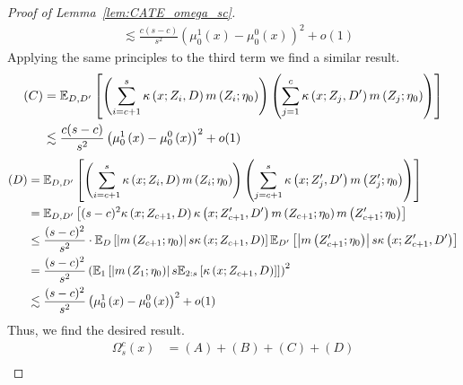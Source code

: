 \begin{proof}[Proof of Lemma~\ref{lem:CATE_omega_sc}]
\begin{equation}
\begin{aligned}
			& \lesssim \frac{c(s-c)}{s^2}\left(\mu_{0}^{1}\left(x\right) - \mu_{0}^{0}\left(x\right)\right)^2  + o(1)
		\end{aligned}
	\end{equation}
	Applying the same principles to the third term we find a similar result.
	\begin{equation}
		\begin{aligned}
			(C)
			& = \mathbb{E}_{D, D^{\prime}}\left[\left(\sum_{i = c + 1}^{s} \kappa\left(x; Z_{i}, D\right) m\left(Z_{i}; \eta_{0}\right)\right)
            \left(\sum_{j = 1}^{c} \kappa\left(x; Z_{j}, D^{\prime}\right) m\left(Z_{j}; \eta_{0}\right)\right)\right]\\
			& \lesssim \frac{c(s-c)}{s^2}\left(\mu_{0}^{1}\left(x\right) - \mu_{0}^{0}\left(x\right)\right)^2  + o(1)
		\end{aligned}
	\end{equation}
	\begin{equation}
		\begin{aligned}
			(D)
			& = \mathbb{E}_{D, D^{\prime}}\left[\left(\sum_{i = c + 1}^{s} \kappa\left(x; Z_{i}, D\right) m\left(Z_{i}; \eta_{0}\right)\right)
            \left(\sum_{j = c + 1}^{s} \kappa\left(x; Z_{j}^{\prime}, D^{\prime}\right) m\left(Z_{j}^{\prime}; \eta_{0}\right)\right)\right] \\
			& = \mathbb{E}_{D, D^{\prime}}\left[(s-c)^2 \kappa\left(x; Z_{c+1}, D\right)\kappa\left(x; Z_{c+1}^{\prime}, D^{\prime}\right)
			 m\left(Z_{c+1}; \eta_{0}\right)  m\left(Z_{c+1}^{\prime}; \eta_{0}\right)\right] \\
			 & \leq \frac{(s-c)^2}{s^2} \cdot \mathbb{E}_{D}\left[\left|m\left(Z_{c+1}; \eta_{0}\right)\right| s \kappa\left(x; Z_{c+1}, D\right)\right]
			 \mathbb{E}_{D^{\prime}}\left[\left|m\left(Z_{c+1}^{\prime}; \eta_{0}\right)\right| s \kappa\left(x; Z_{c+1}^{\prime}, D^{\prime}\right) \right]\\
			 & = \frac{(s-c)^2}{s^2} \left(\mathbb{E}_{1}\left[\left|m\left(Z_{1}; \eta_{0}\right)\right| s \mathbb{E}_{2:s}\left[\kappa\left(x; Z_{c+1}, D\right)\right]\right]\right)^2 \\
			 & \lesssim \frac{(s-c)^2}{s^2}\left(\mu_{0}^{1}\left(x\right) - \mu_{0}^{0}\left(x\right)\right)^2  + o(1)
		\end{aligned}
	\end{equation}
	Thus, we find the desired result.
	\begin{equation}
		\begin{aligned}
			\Omega_{s}^{c}\left(x\right)
			& = (A) + (B) + (C) + (D) \\

\end{aligned}
\end{equation}
\end{proof}

